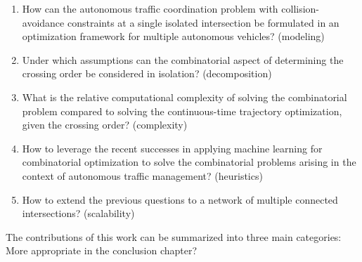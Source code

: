 \documentclass[a4paper]{report}
\theoremstyle{definition}
\theoremstyle{plain}
\newcommand\note[1]{{\color{Navy}#1}}
\begin{document}
\begin{enumerate}[label=RQ\arabic*:, leftmargin=3em, rightmargin=4em]
  \item How can the autonomous traffic coordination problem with
        collision-avoidance constraints at a single isolated intersection be
        formulated in an optimization framework for multiple autonomous
        vehicles? (modeling)

  \item Under which assumptions can the combinatorial aspect of determining the
        crossing order be considered in isolation? (decomposition)

  \item What is the relative computational complexity of solving the
        combinatorial problem compared to solving the continuous-time trajectory
        optimization, given the crossing order? (complexity)

  \item How to leverage the recent successes in applying machine learning for
        combinatorial optimization to solve the combinatorial problems arising
        in the context of autonomous traffic management? (heuristics)

  \item How to extend the previous questions to a network of multiple connected
        intersections? (scalability)
\end{enumerate}



The contributions of this work can be summarized into three main categories:
\note{More appropriate in the conclusion chapter?}
\end{document}
